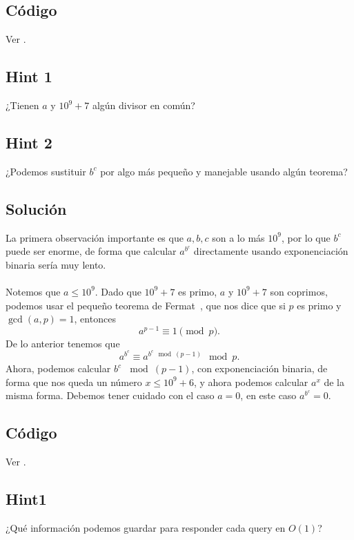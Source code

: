 \subsection*{Código}
Ver .

\subsection*{Hint 1}
¿Tienen $a$ y $10^9+7$ algún divisor en común?
\subsection*{Hint 2}
¿Podemos sustituir $b^c$ por algo más pequeño y manejable usando algún teorema?
\subsection*{Solución}
La primera observación importante es que $a,b,c$ son a lo más $10^9$, por lo que $b^c$ puede ser enorme, de forma que calcular $a^{b^c}$ directamente usando exponenciación binaria sería muy lento.
\\\\
Notemos que $a\leq 10^9$. Dado que $10^9+7$ es primo, $a$ y $10^9+7$ son coprimos, podemos usar el pequeño teorema de Fermat~\cite{perez_numeros}, que nos dice que si $p$ es primo y $\gcd(a,p)=1$, entonces
\[a^{p-1}\equiv 1 \pmod p.\]
De lo anterior tenemos que
\[a^{b^c} \equiv a^{b^c \mod (p-1)} \mod p.\]
Ahora, podemos calcular $b^c \, \mod (p-1)$, con exponenciación binaria, de forma que nos queda un número $x\leq 10^9+6$, y ahora podemos calcular $a^x$ de la misma forma. Debemos tener cuidado con el caso $a=0$, en este caso $a^{b^c}=0$.
\subsection*{Código}
Ver .

\subsection*{Hint1}
¿Qué información podemos guardar para responder cada query en $O(1)$?
